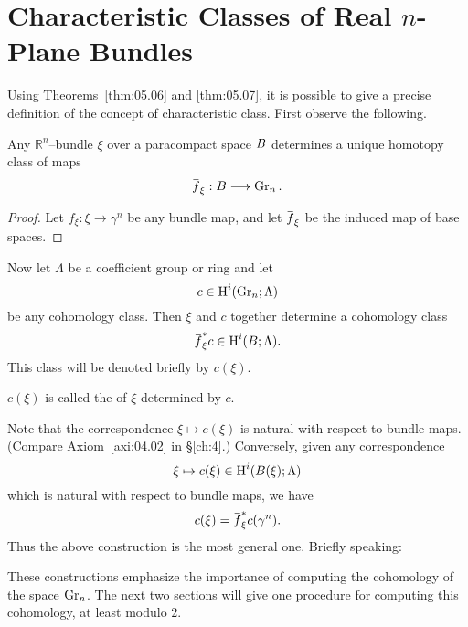 \documentclass[../main]{subfiles}
\begin{document}
\section{Characteristic Classes of Real \texorpdfstring{$n$}{n}-Plane Bundles}\label{5.4}
Using Theorems~\ref{thm:05.06} and \ref{thm:05.07}, it is possible to give a precise definition of the concept of characteristic class. First observe the following.

\begin{corollary}
\label{cor:5.10}
Any ${\mathbb R}^n$--bundle $\xi$ over a paracompact space $B$ determines a unique homotopy class of maps \[{\xoverline f}_\xi : \base \longrightarrow \grassmannian_n.\] 
\end{corollary}

\begin{proof}
Let $f_\xi : \xi \longrightarrow \gamma^n$ be any bundle map, and let ${\xoverline f}_\xi$ be the induced map of base spaces.
\end{proof}

Now let $\Lambda$ be a coefficient group or ring and let \[c \in \operatorname{H}^i(\operatorname{Gr}_n; \Lambda)\] be any cohomology class. Then $\xi$ and $c$ together determine a cohomology class \[{\xoverline f}_\xi^\ast c \in \homology^i(\base; \Lambda).\] This class will be denoted briefly by $c(\xi)$. 

\begin{definition}
$c(\xi)$ is called the  of $\xi$ determined by $c$.
\end{definition}

Note that the correspondence $\xi \mapsto c(\xi)$ is natural with respect to bundle maps. (Compare Axiom~\ref{axi:04.02} in \S\ref{ch:4}.) Conversely, given any correspondence \[\xi \mapsto c(\xi) \in \operatorname{H}^i(B(\xi); \Lambda)\] which is natural with respect to bundle maps, we have \[c(\xi) = {\xoverline f}_\xi^\ast c(\gamma^n).\] Thus the above construction is the most general one. Briefly speaking:  

These constructions emphasize the importance of computing the cohomology of the space $\operatorname{Gr}_n$. The next two sections will give one procedure for computing this cohomology, at least modulo $2$.
\end{document}
